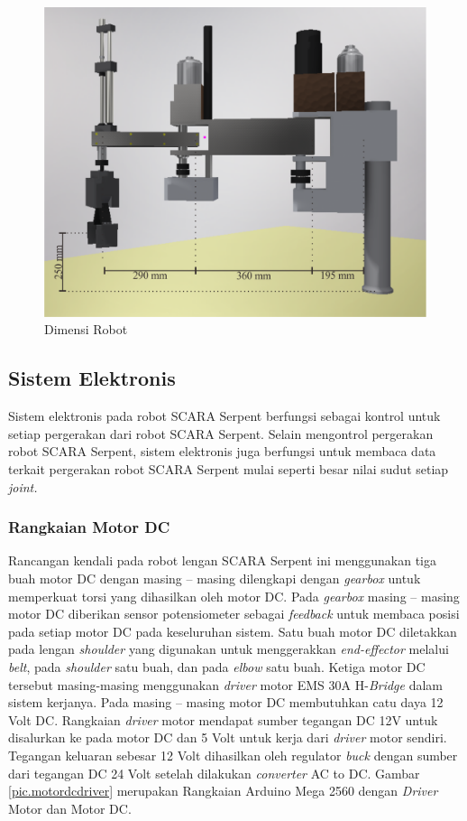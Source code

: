 \begin{figure}[H]
	\centering
	\includegraphics[height=9 cm]{gambar/SCARAdimensi.png}
	\caption{Dimensi Robot}
	\label{pic.SCARAdimensi}
\end{figure}

\subsection{Sistem Elektronis}
Sistem elektronis pada robot SCARA Serpent berfungsi sebagai kontrol untuk setiap pergerakan dari robot SCARA Serpent. Selain mengontrol pergerakan robot SCARA Serpent, sistem elektronis juga berfungsi untuk membaca data terkait pergerakan robot SCARA Serpent mulai seperti besar nilai sudut setiap \textit{joint.}
\subsubsection{Rangkaian Motor DC}
Rancangan kendali pada robot lengan SCARA Serpent ini menggunakan tiga buah motor DC dengan masing – masing dilengkapi dengan \textit{gearbox} untuk memperkuat torsi yang dihasilkan oleh motor DC. Pada  \textit{gearbox} masing – masing motor  DC diberikan sensor potensiometer sebagai \textit{feedback} untuk membaca posisi pada setiap motor DC pada keseluruhan sistem. Satu buah motor DC diletakkan pada lengan \textit{shoulder} yang digunakan untuk menggerakkan \textit{end-effector} melalui \textit{belt}, pada \textit{shoulder} satu buah, dan pada \textit{elbow} satu buah. Ketiga motor DC tersebut masing-masing menggunakan \textit{driver} motor EMS 30A H-\textit{Bridge} dalam sistem kerjanya. Pada masing – masing motor DC membutuhkan catu daya 12 Volt DC. Rangkaian \textit{driver} motor mendapat sumber tegangan DC 12V untuk disalurkan ke pada motor DC dan 5 Volt untuk kerja dari \textit{driver} motor sendiri. Tegangan keluaran sebesar 12 Volt dihasilkan oleh regulator \textit{buck} dengan sumber dari tegangan DC 24 Volt setelah dilakukan \textit{converter} AC to DC. Gambar \ref{pic.motordcdriver} merupakan Rangkaian Arduino Mega 2560 dengan \textit{Driver} Motor dan Motor DC.  

